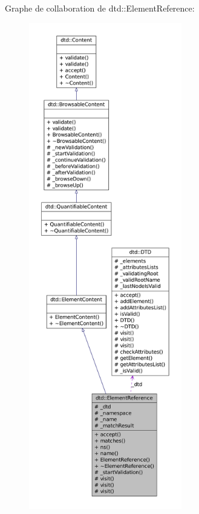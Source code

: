 Graphe de collaboration de dtd::ElementReference:
\nopagebreak
\begin{figure}[H]
\begin{center}
\leavevmode
\includegraphics[height=600pt]{classdtd_1_1_element_reference__coll__graph}
\end{center}
\end{figure}
